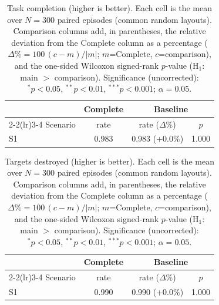 
\begin{table}[ht]
  \centering
  \caption{Task completion (higher is better). Each cell is the mean over $N=300$ paired episodes (common random layouts). Comparison columns add, in parentheses, the relative deviation from the Complete column as a percentage ($\Delta\%=100\,(c-m)/|m|$; $m$=Complete, $c$=comparison), and the one-sided Wilcoxon signed-rank $p$-value (H$_1$: main $>$ comparison). Significance (uncorrected): $^{*}p<0.05$, $^{**}p<0.01$, $^{***}p<0.001$; $\alpha=0.05$.}
  \label{tab:wilcoxon-completion}
  \small
  \begin{tabular}{l c cc}
    \toprule
     & Complete & \multicolumn{2}{c}{Baseline} \\
    \cmidrule(lr){2-2}\cmidrule(lr){3-4}
    Scenario & {rate} & {rate ($\Delta$\%)} & {$p$} \\
    \midrule
    S1 & 0.983 & 0.983 (+0.0\%) & 1.000 \\
    \bottomrule
  \end{tabular}
\end{table}

\begin{table}[ht]
  \centering
  \caption{Targets destroyed (higher is better). Each cell is the mean over $N=300$ paired episodes (common random layouts). Comparison columns add, in parentheses, the relative deviation from the Complete column as a percentage ($\Delta\%=100\,(c-m)/|m|$; $m$=Complete, $c$=comparison), and the one-sided Wilcoxon signed-rank $p$-value (H$_1$: main $>$ comparison). Significance (uncorrected): $^{*}p<0.05$, $^{**}p<0.01$, $^{***}p<0.001$; $\alpha=0.05$.}
  \label{tab:wilcoxon-targets}
  \small
  \begin{tabular}{l c cc}
    \toprule
     & Complete & \multicolumn{2}{c}{Baseline} \\
    \cmidrule(lr){2-2}\cmidrule(lr){3-4}
    Scenario & {rate} & {rate ($\Delta$\%)} & {$p$} \\
    \midrule
    S1 & 0.990 & 0.990 (+0.0\%) & 1.000 \\
    \bottomrule
  \end{tabular}
\end{table}

